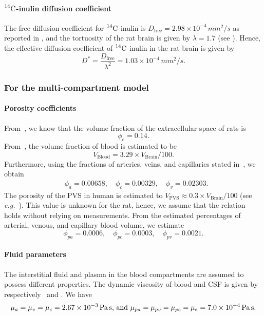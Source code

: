 \documentclass[10pt]{article}
\newcommand{\eg}{\emph{e.g.}\;}
\newcommand{\1}{^{(1)}}
\newcommand{\2}{^{(2)}}
\newcommand{\Cinulin}{$\prescript{14}{}{\text{C}}$-inulin }
\begin{document}
\paragraph{\Cinulin diffusion coefficient}
The free diffusion coefficient for \Cinulin is $ D_\text{free} = 2.98 \times 10^{-4} \, \si{mm^2/s}$ as reported in \cite{lanman1971diffusion}, and the tortuosity of the rat brain is given by $ \lambda=1.7 $ (see \cite{Waters-2011-AB}). Hence, the effective diffusion coefficient of \Cinulin in the rat brain is given by
\[ 
  D^{*} = \frac{D_\text{free}}{\lambda^2} = 1.03\times 10^{-4} \, \si{mm^2/s}.
\]


\subsubsection{For the multi-compartment model}

\paragraph{Porosity coefficients}
From~\cite{Cserr-1991-Extracellular}, we know that the volume fraction of the extracellular space of rats is
\[
    \phi_e = 0.14.
\]
From~\cite{Adriana-2007-MR}, the volume fraction of blood is estimated to be 
\[
    V_\text{Blood} = 3.29 \times V_\text{Brain}/100.
\]
Furthermore, using the fractions of arteries, veins, and capillaries stated in~\cite{Lee-2001-CBV}, we obtain
\[
\begin{aligned}
    &\phi_a = 0.00658, \quad \phi_c = 0.00329,\quad \phi_v = 0.02303.
\end{aligned}
\]
The porosity of the PVS in human is estimated to $V_\text{PVS} \approx 0.3\times V_\text{Brain}/100$ (see \eg~\cite{BALLERINI2020102120}). This value is unknown for the rat, hence, we assume that the relation holds without relying on measurements. 
From the estimated percentages of arterial, venous, and capillary blood volume, we estimate 
\[
    \phi_{pa} = 0.0006, \quad \phi_{pc} = 0.0003,\quad \phi_{pv} = 0.0021.
\]


\paragraph{Fluid parameters}

The interstitial fluid and plasma in the blood compartments are assumed to possess different properties. 
The dynamic viscosity of blood and CSF is given by respectively~\cite{Guo-2019-MPET} and \cite{bloomfield1998effects}. We have 
\[
    \mu_a = \mu_v = \mu_c = 2.67 \times 10^{-3} \, \text{\si{\pascal \second}, and }  \mu_{pa} = \mu_{pv} = \mu_{pc}  = \mu_e = 7.0 \times 10^{-4}\, \text{\si{\pascal \second}}.
\]
\end{document}
